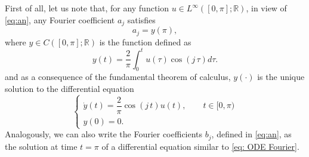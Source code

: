 \documentclass[twocolumn]{autart}    %
\begin{document}
First of all,  let us note that, for any function $u\in L^\infty ([0,\pi]; \mathbb{R})$, in view of \eqref{eq:an},  any Fourier coefficient $a_j$ satisfies
$$
a_j = y(\pi),
$$
where $y\in C([0,\pi];\mathbb{R})$ is the function defined as
$$
y(t) = \dfrac{2}{\pi} \int_0^t u(\tau) \cos(j\, \tau) d\tau.
$$
and as a consequence of the fundamental theorem of calculus, $y(\cdot)$ is the unique solution to the differential equation
\begin{equation}
\label{eq: ODE Fourier}
\left\{\begin{array}{l}
\dot{y} (t) = \dfrac{2}{\pi} \cos(j\, t) u(t), \qquad  t\in [0,\pi) \\
y(0) = 0.
\end{array}\right.
\end{equation}
Analogously, we can also write the Fourier coefficients $b_j$, defined in  \eqref{eq:an}, as the solution at time $t=\pi$ of a differential equation similar to \eqref{eq: ODE Fourier}.
\end{document}
